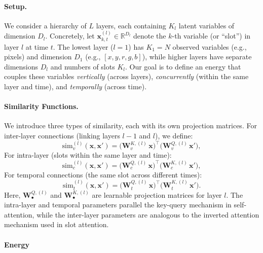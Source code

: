 \documentclass{article}
\begin{document}
\paragraph{Setup.}
We consider a hierarchy of \(L\) layers, each containing \(K_l\) latent variables of dimension \(D_l\). Concretely, let 
\(\bm{x}_{k,t}^{(l)} \in \mathbb{R}^{D_l}\)
denote the \(k\)-th variable (or ``slot'') in layer \(l\) at time \(t\). The lowest layer (\(l=1\)) has \(K_1 = N\) observed variables (e.g., pixels) and dimension \(D_1\) (e.g., \([x, y, r, g, b]\)), while higher layers have separate dimensions \(D_l\) and numbers of slots \(K_l\). Our goal is to define an energy that couples these variables \emph{vertically} (across layers), \emph{concurrently} (within the same layer and time), and \emph{temporally} (across time).

\paragraph{Similarity Functions.}
We introduce three types of similarity, each with its own projection matrices. For inter-layer connections (linking layers \(l-1\) and \(l\)), we define:
\begin{equation}
\mathrm{sim}_{v}^{(l)}(\bm{x}, \bm{x}')
=
\bigl(\bm{W}_{v}^{K,(l)}\,\bm{x}\bigr)^\top
\bigl(\bm{W}_{v}^{Q,(l)}\,\bm{x}'\bigr),
\end{equation}
For intra-layer (slots within the same layer and time):
\begin{equation}
\mathrm{sim}_{c}^{(l)}(\bm{x}, \bm{x}')
=
\bigl(\bm{W}_{c}^{Q,(l)}\,\bm{x}\bigr)^\top
\bigl(\bm{W}_{c}^{K,(l)}\,\bm{x}'\bigr),
\end{equation}
For temporal connections (the same slot across different times):
\begin{equation}
\mathrm{sim}_{t}^{(l)}(\bm{x}, \bm{x}')
=
\bigl(\bm{W}_{t}^{Q,(l)}\,\bm{x}\bigr)^\top
\bigl(\bm{W}_{t}^{K,(l)}\,\bm{x}'\bigr).
\end{equation}
Here, \(\bm{W}_{\bullet}^{Q,(l)}\) and \(\bm{W}_{\bullet}^{K,(l)}\) are learnable projection matrices for layer \(l\). The intra-layer and temporal parameters parallel the key-query mechanism in self-attention, while the inter-layer parameters are analogous to the inverted attention mechanism used in slot attention.


\paragraph{Energy}
\end{document}
